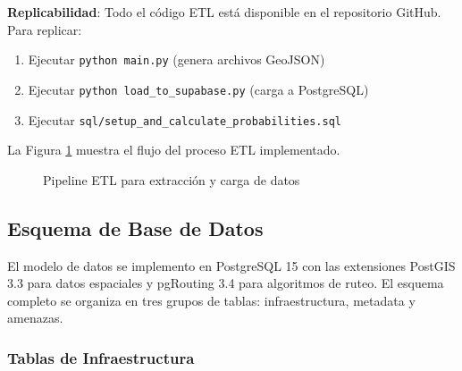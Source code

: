 \documentclass[conference]{IEEEtran}
\begin{document}
\textbf{Replicabilidad}: Todo el código ETL está disponible en el repositorio GitHub. Para replicar:
\begin{enumerate}
    \item Ejecutar \texttt{python main.py} (genera archivos GeoJSON)
    \item Ejecutar \texttt{python load\_to\_supabase.py} (carga a PostgreSQL)
    \item Ejecutar \texttt{sql/setup\_and\_calculate\_probabilities.sql}
\end{enumerate}

La Figura \ref{fig:etl} muestra el flujo del proceso ETL implementado.

\begin{figure}[!t]
\centering
{}
\caption{Pipeline ETL para extracción y carga de datos}
\label{fig:etl}
\end{figure}

\subsection{Esquema de Base de Datos}

El modelo de datos se implemento en PostgreSQL 15 con las extensiones PostGIS 3.3 para datos espaciales y pgRouting 3.4 para algoritmos de ruteo. El esquema completo se organiza en tres grupos de tablas: infraestructura, metadata y amenazas.

\subsubsection{Tablas de Infraestructura}
\end{document}
